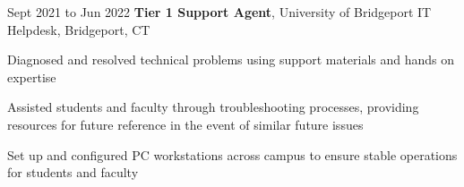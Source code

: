     \vspace{0.2 cm}

    \begin{twocolentry}{
        Sept 2021 to Jun 2022
    }
        \textbf{Tier 1 Support Agent}, University of Bridgeport IT Helpdesk, Bridgeport, CT\end{twocolentry}

    \vspace{0.10 cm}
    \begin{onecolentry}
        \begin{highlights}
            \item Diagnosed and resolved technical problems using support materials and hands on expertise
            \item Assisted students and faculty through troubleshooting processes, providing resources for future reference in the event of similar future issues
            \item Set up and configured PC workstations across campus to ensure stable operations for students and faculty
        \end{highlights}
    \end{onecolentry}